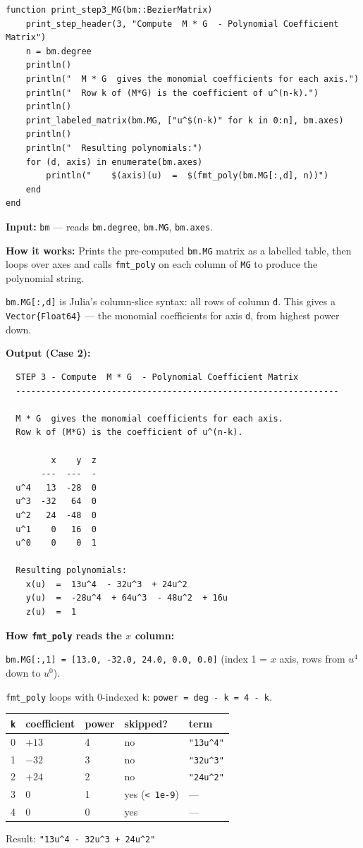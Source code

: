 \documentclass[12pt, a4paper]{article}
\newcommand{\cd}[1]{\texttt{#1}}
\begin{document}
\begin{verbatim}
function print_step3_MG(bm::BezierMatrix)
    print_step_header(3, "Compute  M * G  - Polynomial Coefficient Matrix")
    n = bm.degree
    println()
    println("  M * G  gives the monomial coefficients for each axis.")
    println("  Row k of (M*G) is the coefficient of u^(n-k).")
    println()
    print_labeled_matrix(bm.MG, ["u^$(n-k)" for k in 0:n], bm.axes)
    println()
    println("  Resulting polynomials:")
    for (d, axis) in enumerate(bm.axes)
        println("    $(axis)(u)  =  $(fmt_poly(bm.MG[:,d], n))")
    end
end
\end{verbatim}

\textbf{Input:} \cd{bm} --- reads \cd{bm.degree}, \cd{bm.MG}, \cd{bm.axes}.

\textbf{How it works:}
Prints the pre-computed \cd{bm.MG} matrix as a labelled table,
then loops over axes and calls \cd{fmt\_poly} on each column
of \cd{MG} to produce the polynomial string.

\cd{bm.MG[:,d]} is Julia's column-slice syntax:
all rows of column \cd{d}.
This gives a \cd{Vector\{Float64\}} --- the monomial
coefficients for axis \cd{d}, from highest power down.

\textbf{Output (Case 2):}
\begin{verbatim}
  STEP 3 - Compute  M * G  - Polynomial Coefficient Matrix
  ----------------------------------------------------------------

  M * G  gives the monomial coefficients for each axis.
  Row k of (M*G) is the coefficient of u^(n-k).

         x    y  z
       ---  ---  -
  u^4   13  -28  0
  u^3  -32   64  0
  u^2   24  -48  0
  u^1    0   16  0
  u^0    0    0  1

  Resulting polynomials:
    x(u)  =  13u^4  - 32u^3  + 24u^2
    y(u)  =  -28u^4  + 64u^3  - 48u^2  + 16u
    z(u)  =  1
\end{verbatim}

\begin{examplebox}
\textbf{How \cd{fmt\_poly} reads the $x$ column:}

\cd{bm.MG[:,1] = [13.0, -32.0, 24.0, 0.0, 0.0]}
(index 1 = $x$ axis, rows from $u^4$ down to $u^0$).

\cd{fmt\_poly} loops with 0-indexed \cd{k}:
\cd{power = deg - k = 4 - k}.

\medskip
\begin{tabular}{lllll}
\toprule
\cd{k} & coefficient & power & skipped? & term \\
\midrule
0 & $+13$ & 4 & no & \cd{"13u\^{}4"} \\
1 & $-32$ & 3 & no & \cd{"32u\^{}3"} \\
2 & $+24$ & 2 & no & \cd{"24u\^{}2"} \\
3 & $0$   & 1 & yes (\cd{< 1e-9}) & --- \\
4 & $0$   & 0 & yes & --- \\
\bottomrule
\end{tabular}

\medskip
Result: \cd{"13u\^{}4  - 32u\^{}3  + 24u\^{}2"}
\end{examplebox}
\end{document}
